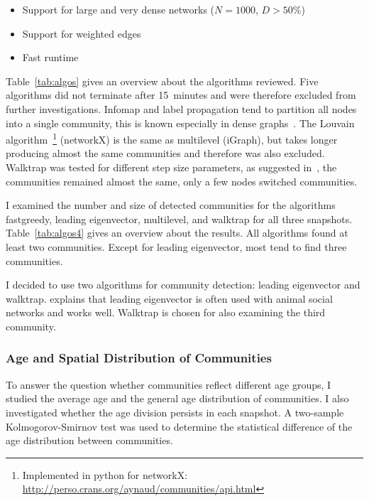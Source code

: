 \begin{itemize}
\item Support for large and very dense networks ($N=1000$, $D>50\%$)
\item Support for weighted edges
\item Fast runtime
\end{itemize}

Table~\ref{tab:algos} gives an overview about the algorithms reviewed. Five algorithms did not terminate after 15~minutes and were therefore excluded from further investigations. Infomap and label propagation tend to partition all nodes into a single community, this is known especially in dense graphs~\cite{yang2016comparative, fortunato2010community}.
The Louvain algorithm~\footnote{Implemented in python for networkX: \url{http://perso.crans.org/aynaud/communities/api.html}} (networkX) is the same as multilevel (iGraph), but takes longer producing almost the same communities and therefore was also excluded. Walktrap was tested for different step size parameters, as suggested in~\cite{pons2005computing}, the communities remained almost the same, only a few nodes switched communities.

I examined the number and size of detected communities for the algorithms fastgreedy, leading eigenvector, multilevel, and walktrap for all three snapshots. Table~\ref{tab:algos4} gives an overview about the results.
All algorithms found at least two communities.
Except for leading eigenvector, most tend to find three communities.

I decided to use two algorithms for community detection: leading eigenvector and walktrap. \textcite{farine2015constructing} explains that leading eigenvector is often used with animal social networks and works well. Walktrap is chosen for also examining the third community.




\subsubsection{Age and Spatial Distribution of Communities}
To answer the question whether communities reflect different age groups, I studied the average age and the general age distribution of communities. I also investigated whether the age division persists in each snapshot. A two-sample Kolmogorov-Smirnov test was used to determine the statistical difference of the age distribution between communities.

